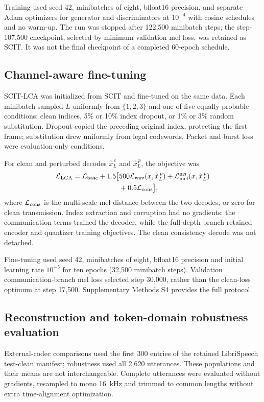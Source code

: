 \documentclass[final,5p,times,twocolumn]{elsarticle}
\begin{document}
Training used seed 42, minibatches of eight, bfloat16 precision, and separate Adam optimizers for generator and discriminators at $10^{-4}$ with cosine schedules and no warm-up. The run was stopped after 122,500 minibatch steps; the step-107,500 checkpoint, selected by minimum validation mel loss, was retained as SCIT. It was not the final checkpoint of a completed 60-epoch schedule.

\subsection{Channel-aware fine-tuning}
SCIT-LCA was initialized from SCIT and fine-tuned on the same data. Each minibatch sampled $L$ uniformly from $\{1,2,3\}$ and one of five equally probable conditions: clean indices, 5\% or 10\% index dropout, or 1\% or 3\% random substitution. Dropout copied the preceding original index, protecting the first frame; substitution drew uniformly from legal codewords. Packet and burst loss were evaluation-only conditions.

For clean and perturbed decodes $\hat{x}_{L}^{\,c}$ and $\hat{x}_{L}^{\,p}$, the objective was
\begin{equation}
\begin{split}
 \mathcal L_{\rm LCA}
 =\mathcal L_{\rm base}
 +1.5\bigl[&
 500\mathcal L_{\rm wav}(x,\hat{x}_{L}^{\,p})
 +\mathcal L_{\rm mel}^{\rm ms}(x,\hat{x}_{L}^{\,p})\\
 &+0.5\mathcal L_{\rm cons}\bigr],
\end{split}
\end{equation}
where $\mathcal L_{\rm cons}$ is the multi-scale mel distance between the two decodes, or zero for clean transmission. Index extraction and corruption had no gradients: the communication terms trained the decoder, while the full-depth branch retained encoder and quantizer training objectives. The clean consistency decode was not detached.

Fine-tuning used seed 42, minibatches of eight, bfloat16 precision and initial learning rate $10^{-5}$ for ten epochs (32,500 minibatch steps). Validation communication-branch mel loss selected step 30,000, rather than the clean-loss optimum at step 17,500. Supplementary Methods S4 provides the full protocol.

\subsection{Reconstruction and token-domain robustness evaluation}
External-codec comparisons used the first 300 entries of the retained LibriSpeech test-clean manifest; robustness used all 2,620 utterances. These populations and their means are not interchangeable. Complete utterances were evaluated without gradients, resampled to mono 16~kHz and trimmed to common lengths without extra time-alignment optimization.
\end{document}

